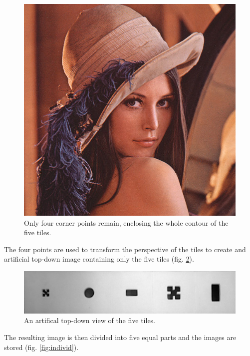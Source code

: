 \documentclass{article}
\begin{document}
\begin{figure}[h!]
\centering
\includegraphics[scale=0.3]{images/lenna.png}
\caption{Only four corner points remain, enclosing the whole contour of the five tiles.}
\label{fig:points}
\end{figure}
The four points are used to transform the perspective of the tiles to create and artificial top-down image containing only the five tiles (fig. \ref{fig:homograph}).\\
\begin{figure}[h!]
\centering
\includegraphics[scale=0.3]{images/homography.jpg}
\caption{An artifical top-down view of the five tiles.}
\label{fig:homograph}
\end{figure}
The resulting image is then divided into five equal parts and the images are stored (fig. \ref{fig:individ}).\\
\end{document}
